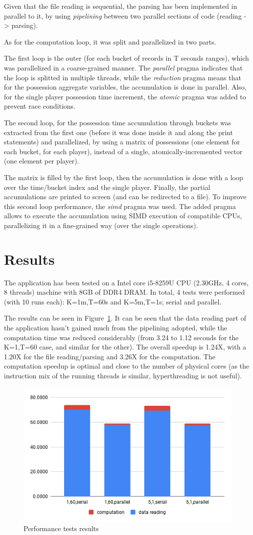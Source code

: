\documentclass[a4paper, 10pt]{article}
\begin{document}
Given that the file reading is sequential, the parsing has been implemented in parallel to it, by using \emph{pipelining} between two parallel sections of code (reading -> parsing).

As for the computation loop, it was split and parallelized in two parts.

The first loop is the outer (for each bucket of records in T seconds ranges), which was parallelized in a coarse-grained manner.
The \emph{parallel} pragma indicates that the loop is splitted in multiple threads, while the \emph{reduction} pragma means that for the possession aggregate variables, the accumulation is done in parallel.
Also, for the single player possession time increment, the \emph{atomic} pragma was added to prevent race conditions.

The second loop, for the possession time accumulation through buckets was extracted from the first one (before it was done inside it and along the print statements) and parallelized, by using a matrix of possessions (one element for each bucket, for each player), instead of a single, atomically-incremented vector (one element per player).

The matrix is filled by the first loop, then the accumulation is done with a loop over the time/bucket index and the single player.
Finally, the partial accumulations are printed to screen (and can be redirected to a file).
To improve this second loop performance, the \emph{simd} pragma was used.
The added pragma allows to execute the accumulation using SIMD execution of compatible CPUs, parallelizing it in a fine-grained way (over the single operations).

\section*{Results}

The application has been tested on a Intel core i5-8259U CPU (2.30GHz, 4 cores, 8 threads) machine with 8GB of DDR4 DRAM.
In total, 4 tests were performed (with 10 runs each): K=1m,T=60s and K=5m,T=1s; serial and parallel.

The results can be seen in Figure~\ref{fig:results}. It can be seen that the data reading part of the application hasn't gained much from the pipelining adopted, while the computation time was reduced considerably (from 3.24 to 1.12 seconds for the K=1,T=60 case, and similar for the other).
The overall speedup is 1.24X, with a 1.20X for the file reading/parsing and 3.26X for the computation.
The computation speedup is optimal and close to the number of physical cores (as the instruction mix of the running threads is similar, hyperthreading is not useful).


\begin{figure}[h]
\centering
    \includegraphics[width=0.66\linewidth]{images/results.png}
    \caption{Performance tests results}
   \label{fig:results}
\end{figure}
\end{document}
